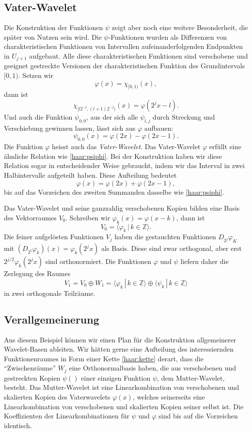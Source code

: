 \subsection{Vater-Wavelet}
Die Konstruktion der Funktionen $\psi$ zeigt aber noch eine weitere 
Besonderheit, die später von Nutzen sein wird.
Die $\psi$-Funktionen wurden als Differenzen von charakteristischen
Funktionen von Intervallen aufeinanderfolgenden Endpunkten in $U_{j+1}$
aufgebaut.
Alle diese charakteristischen Funktionen sind verschobene und geeignet
gestreckte Versionen der charakteristischen Funktion des Grundintervals
$[0,1)$.
Setzen wir
\[
\varphi(x) = \chi_{[0,1)} (x),
\]
dann ist
\[
\chi_{[l2^{-j},(l+1)2^{-j})}(x)
=
\varphi(2^jx-l).
\]
Und auch die Funktion $\psi_{0,0}$, aus der sich alle $\psi_{l,j}$ durch
Streckung und Verschiebung gewinnen lassen, lässt sich aus $\varphi$
aufbauen:
\begin{equation}
\psi_{0,0}(x) = \varphi(2x) - \varphi(2x - 1).
\label{haar:psiphi}
\end{equation}
Die Funktion $\varphi$ heisst auch das {\em Vater-Wavelet}.
Das Vater-Wavelet $\varphi$ erfüllt eine ähnliche Relation
wie \eqref{haar:psiphi}.
Bei der Konstruktion haben wir diese Relation sogar in entscheidender
Weise gebraucht, indem wir das Interval in zwei Halbintervalle aufgeteilt
haben.
Diese Aufteilung bedeutet
\[
\varphi(x) = \varphi(2x) + \varphi(2x-1),
\]
bis auf das Vorzeichen des zweiten Summanden dasselbe wie 
\eqref{haar:psiphi}.

Das Vater-Wavelet und seine ganzzahlig verschobenen Kopien bilden
eine Basis des Vektorraumes $V_0$.
Schreiben wir $\varphi_k(x)=\varphi(x-k)$, dann ist
\[
V_0 = \langle \varphi_k\,|\, k\in\mathbb Z\rangle.
\]
Die feiner aufgelösten Funktionen $V_j$ haben die gestauchten Funktionen
$D_{2^j}\varphi_K$ mit
$(D_{2^j}\varphi_k)(x)=\varphi_k(2^jx)$ als Basis.
Diese sind zwar orthogonal, aber erst $2^{j/2}\varphi_k(2^jx)$ sind
orthonormiert.
Die Funktionen $\varphi$ und $\psi$ liefern daher die Zerlegung
des Raumes
\[
V_1
=
V_0 \oplus W_1
=
\langle \varphi_k\,|\,k\in\mathbb Z\rangle
\oplus
\langle \psi_k\,|\,k\in\mathbb Z\rangle
\]
in zwei orthogonale Teilräume.

\subsection{Verallgemeinerung}
Aus diesem Beispiel können wir einen Plan für die Konstruktion allgemeinerer
Wavelet-Basen ableiten.
Wir hätten gerne eine Aufteilung des interessiernden Funktionenraumes
in Form einer Kette \eqref{haar:kette} derart, dass die ``Zwischenräume''
$W_j$ eine Orthonormalbasis haben, die aus verschobenen und gestreckten
Kopien
$\psi()$
einer einzigen Funktion $\psi$, dem Mutter-Wavelet, besteht.
Das Mutter-Wavelet ist eine Linearkombination von verschobenen
und skalierten Kopien des Vaterwavelets $\varphi(x)$, welches seinerseits
eine Linearkombination von verschobenen und skalierten Kopien seiner
selbst ist.
Die Koeffizienten der Linearkombinationen für $\psi$ und $\varphi$ sind
bis auf die Vorzeichen identisch.




